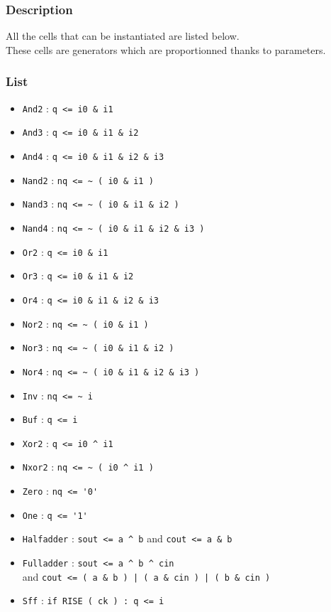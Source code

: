 \subsubsection{Description}

All the cells that can be instantiated are listed below.\\
\indent These cells are generators which are proportionned thanks to parameters.
    
\subsubsection{List}

\begin{itemize}
    \item \verb-And2-  : \verb-q <= i0 & i1-
    \item \verb-And3-  : \verb-q <= i0 & i1 & i2-
    \item \verb-And4-  : \verb-q <= i0 & i1 & i2 & i3-
    \item \verb-Nand2- : \verb-nq <= ~ ( i0 & i1 )-
    \item \verb-Nand3- : \verb-nq <= ~ ( i0 & i1 & i2 )-
    \item \verb-Nand4- : \verb-nq <= ~ ( i0 & i1 & i2 & i3 )-
    \item \verb-Or2-   : \verb-q <= i0 & i1-
    \item \verb-Or3-   : \verb-q <= i0 & i1 & i2-
    \item \verb-Or4-   : \verb-q <= i0 & i1 & i2 & i3-
    \item \verb-Nor2-  : \verb-nq <= ~ ( i0 & i1 )-
    \item \verb-Nor3-  : \verb-nq <= ~ ( i0 & i1 & i2 )-
    \item \verb-Nor4-  : \verb-nq <= ~ ( i0 & i1 & i2 & i3 )-
    \item \verb-Inv-   : \verb-nq <= ~ i-
    \item \verb-Buf-   : \verb-q <= i-
    \item \verb-Xor2-  : \verb-q <= i0 ^ i1-
    \item \verb-Nxor2- : \verb-nq <= ~ ( i0 ^ i1 )-
    \item \verb-Zero-  : \verb-nq <= '0'-
    \item \verb-One-   : \verb-q <= '1'-
    \item \verb-Halfadder- : \verb-sout <= a ^ b- and \verb-cout <= a & b-
    \item \verb-Fulladder- : \verb-sout <= a ^ b ^ cin-\\\indent and \verb-cout <= ( a & b ) | ( a & cin ) | ( b & cin )-
    \item \verb-Sff- : \verb-if RISE ( ck ) : q <= i-
\end{itemize}

